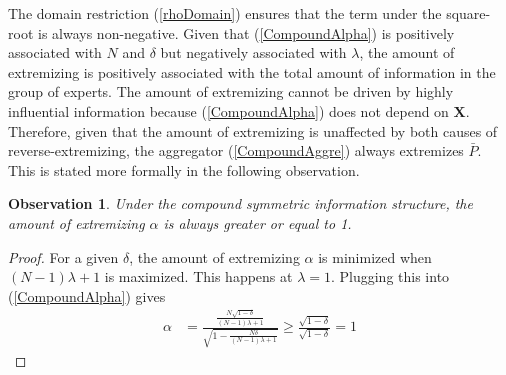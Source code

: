 \documentclass[11pt]{article}
\newtheorem{observation}[theorem]{Observation}
\theoremstyle{definition}
\theoremstyle{definition}
\begin{document}
The domain restriction (\ref{rhoDomain}) ensures that the term under the square-root is always non-negative.  
Given that (\ref{CompoundAlpha}) is positively associated with $N$ and $\delta$ but negatively associated with $\lambda$, the amount of extremizing is positively associated with the total amount of information in the group of experts. The amount of extremizing cannot be driven by highly influential information because (\ref{CompoundAlpha}) does not depend on $\boldsymbol{X}$. Therefore, given that the amount of extremizing is unaffected by both causes of reverse-extremizing, the aggregator (\ref{CompoundAggre}) always extremizes $\bar{P}$. This is stated more formally in the following observation.

\begin{observation}
\label{positiveThm}
Under the compound symmetric information structure, the amount of extremizing $\alpha$ is always greater or equal to 1. 
\end{observation}
\begin{proof} 
For a given $\delta$, the amount of extremizing $\alpha$ is minimized when $(N-1)\lambda +1$ is maximized. This happens at $\lambda = 1$. Plugging this into (\ref{CompoundAlpha}) gives
\begin{align*}
\alpha &= \frac{\frac{N\sqrt{1-\delta}}{(N-1)\lambda +1}}{\sqrt{1- \frac{N\delta}{(N-1)\lambda +1} }}  \geq \frac{\sqrt{1-\delta}}{\sqrt{1-\delta }} = 1
\end{align*}
\end{proof}
\end{document}
